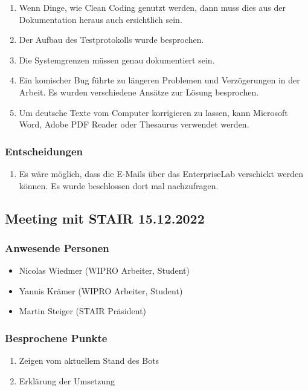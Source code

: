 \documentclass[a4paper, table]{article}
\begin{document}
\begin{enumerate}
    \item Wenn Dinge, wie Clean Coding genutzt werden, dann muss dies aus der Dokumentation heraus auch ersichtlich sein.
    \item Der Aufbau des Testprotokolls wurde besprochen.
    \item Die Systemgrenzen müssen genau dokumentiert sein.
    \item Ein komischer Bug führte zu längeren Problemen und Verzögerungen in der Arbeit. Es wurden verschiedene Ansätze zur Lösung besprochen.
    \item Um deutsche Texte vom Computer korrigieren zu lassen, kann Microsoft Word, Adobe PDF Reader oder Thesaurus verwendet werden.
\end{enumerate}

\subsubsection*{Entscheidungen}

\begin{enumerate}
    \item Es wäre möglich, dass die E-Mails über das EnterpriseLab verschickt werden können. Es wurde beschlossen dort mal nachzufragen.
\end{enumerate}

\newpage
\subsection{Meeting mit STAIR 15.12.2022}

\subsubsection*{Anwesende Personen}

\begin{itemize}
    \item Nicolas Wiedmer (WIPRO Arbeiter, Student)
    \item Yannis Krämer (WIPRO Arbeiter, Student)
    \item Martin Steiger (STAIR Präsident)
\end{itemize}

\subsubsection*{Besprochene Punkte}

\begin{enumerate}
    \item Zeigen vom aktuellem Stand des Bots
    \item Erklärung der Umsetzung
\end{enumerate}
\end{document}
